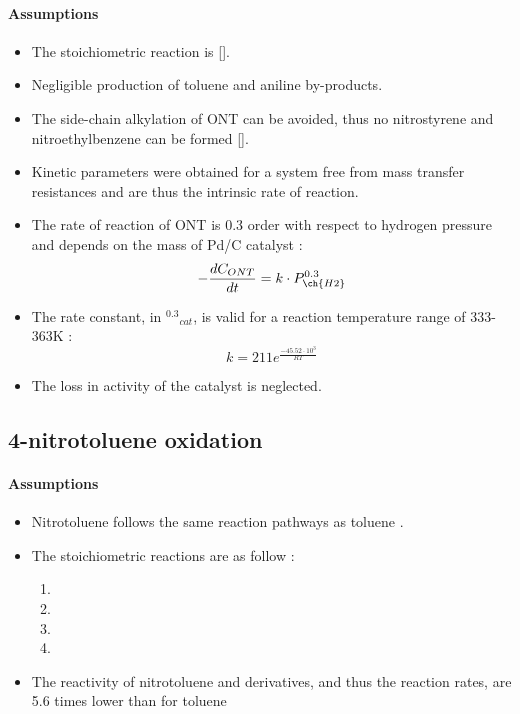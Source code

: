 \paragraph{Assumptions}
\begin{itemize}
    \item The stoichiometric reaction is  [].
    \item Negligible production of toluene and aniline by-products.  
    \item The side-chain alkylation of ONT can be avoided, thus no nitrostyrene and nitroethylbenzene can be formed [].
    \item Kinetic parameters were obtained for a system free from mass transfer resistances and are thus the intrinsic rate of reaction.
    \item The rate of reaction of ONT is 0.3 order with respect to hydrogen pressure and depends on the mass of Pd/C catalyst \cite{rajadhyaksha_solvent_1986}:
    \begin{equation}
    - \frac{dC_{ONT}}{dt}=k \cdot P_{\ch{H2}}^{0.3} 
    \end{equation}
    \item The rate constant, in \mol\per\kPa$^{0.3}$\g$_{cat}$\s, is valid for a reaction temperature range of 333-363K \cite{rajadhyaksha_solvent_1986}:
    \begin{equation}
        k=211e^{\frac{-45.52\cdot 10^{3}}{RT}}
    \end{equation}
    \item The loss in activity of the catalyst is neglected.
\end{itemize}

\subsection{4-nitrotoluene oxidation}
\paragraph{Assumptions}
\begin{itemize}
    \item Nitrotoluene follows the same reaction pathways as toluene \cite{wendt_reaction_1986}.
    \item The stoichiometric reactions are as follow \cite{hoorn_modelling_2005}:
    \begin{enumerate}
        \item {}
        \item {}
        \item {}
        \item {}
    \end{enumerate}
    \item The reactivity of nitrotoluene and derivatives, and thus the reaction rates, are 5.6 times lower than for toluene 
\end{itemize}


